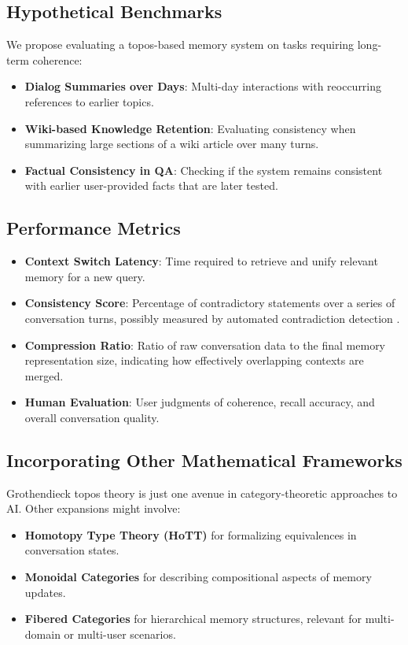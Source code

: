 \documentclass{article}
\begin{document}
\subsection{Hypothetical Benchmarks}

We propose evaluating a topos-based memory system on tasks requiring long-term coherence:
\begin{itemize}
    \item \textbf{Dialog Summaries over Days}: Multi-day interactions with reoccurring references to earlier topics.
    \item \textbf{Wiki-based Knowledge Retention}: Evaluating consistency when summarizing large sections of a wiki article over many turns.
    \item \textbf{Factual Consistency in QA}: Checking if the system remains consistent with earlier user-provided facts that are later tested.
\end{itemize}

\subsection{Performance Metrics}

\begin{itemize}
    \item \textbf{Context Switch Latency}: Time required to retrieve and unify relevant memory for a new query.
    \item \textbf{Consistency Score}: Percentage of contradictory statements over a series of conversation turns, possibly measured by automated contradiction detection \citep{nie2019simple}.
    \item \textbf{Compression Ratio}: Ratio of raw conversation data to the final memory representation size, indicating how effectively overlapping contexts are merged.
    \item \textbf{Human Evaluation}: User judgments of coherence, recall accuracy, and overall conversation quality.
\end{itemize}

\subsection{Incorporating Other Mathematical Frameworks}

Grothendieck topos theory is just one avenue in category-theoretic approaches to AI. Other expansions might involve:
\begin{itemize}
    \item \textbf{Homotopy Type Theory (HoTT)} \citep{hottbook} for formalizing equivalences in conversation states.
    \item \textbf{Monoidal Categories} for describing compositional aspects of memory updates.
    \item \textbf{Fibered Categories} for hierarchical memory structures, relevant for multi-domain or multi-user scenarios.
\end{itemize}
\end{document}
